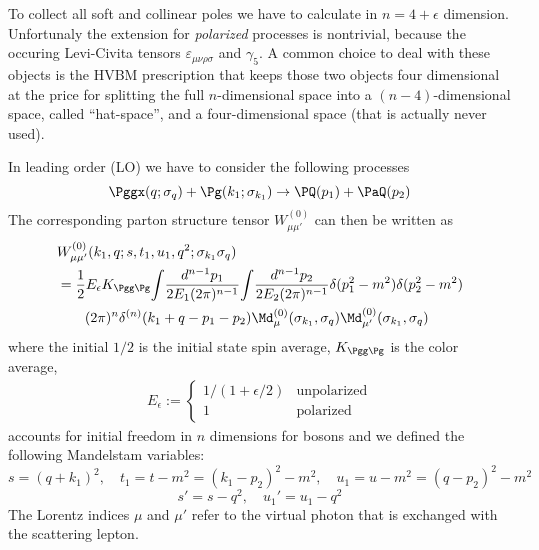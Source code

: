To collect all soft and collinear poles we have to calculate in $n=4+\epsilon$ dimension. Unfortunaly the extension for \textit{polarized} processes is nontrivial, because the occuring Levi-Civita tensors $\varepsilon_{\mu\nu\rho\sigma}$ and $\gamma_5$. A common choice to deal with these objects is the HVBM prescription\cite{breitenlohner1977} that keeps those two objects four dimensional at the price for splitting the full $n$-dimensional space into a $(n-4)$-dimensional space, called \enquote{hat-space}, and a four-dimensional space (that is actually never used).

In leading order (LO) we have to consider the following processes
\begin{equation}
\Pggx(q;\sigma_q) + \Pg(k_1;\sigma_{k_1}) \rightarrow \PQ(p_1)+\PaQ(p_2)
\end{equation}
The corresponding parton structure tensor $W_{\mu\mu'}^{(0)}$ can then be written as
\begin{align}
&W_{\mu\mu'}^{(0)}(k_1,q;s,t_1,u_1,q^2;\sigma_{k_1}\sigma_{q})\nonumber\\
 &= \frac 1 2 E_\epsilon K_{\Pgg\Pg}\!\int\!\frac{d^{n-1}p_1}{2E_1(2\pi)^{n-1}}\!\int\!\frac{d^{n-1}p_2}{2E_2(2\pi)^{n-1}}\delta(p_1^2-m^2) \delta(p_2^2-m^2)\nonumber\\
 &\hspace{20pt}(2\pi)^n\delta^{(n)}(k_1+q-p_1-p_2) \Md_{\mu}^{(0)}(\sigma_{k_1},\sigma_q)\Md_{\mu'}^{(0)}(\sigma_{k_1},\sigma_q)
\label{eq:PartonicStructureTensor0}\end{align}
where the initial $1/2$ is the initial state spin average, $K_{\Pgg\Pg}$ is the color average,
\begin{align}
E_\epsilon := \left\{\begin{array}{ll}
1/(1+\epsilon/2) &\text{unpolarized}\\
1 &\text{polarized}
\end{array}\right.
\end{align}
accounts for initial freedom in $n$ dimensions for bosons and we defined the following Mandelstam variables:
\begin{equation}
s = (q+k_1)^2, \quad t_1=t-m^2=(k_1-p_2)^2-m^2, \quad u_1 = u - m^2 = (q-p_2)^2 -m^2
\end{equation}
\begin{equation}
s' = s-q^2,\quad u_1' = u_1 - q^2
\end{equation}
The Lorentz indices $\mu$ and $\mu'$ refer to the virtual photon that is exchanged with the scattering lepton.

